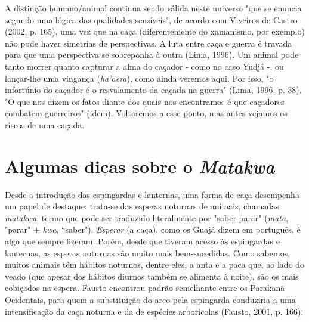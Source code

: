 A distinção humano/animal continua sendo válida neste universo "que se
enuncia segundo uma lógica das qualidades sensíveis", de acordo com
Viveiros de Castro (2002, p. 165), uma vez que na caça (diferentemente
do xamanismo, por exemplo) não pode haver simetrias de perspectivas. A
luta entre caça e guerra é travada para que uma perspectiva se
sobreponha à outra (Lima, 1996). Um animal pode tanto morrer quanto
capturar a alma do caçador - como no caso Yudjá -, ou lançar-lhe uma
vingança (\emph{ha'aera}), como ainda veremos aqui. Por isso, "o
infortúnio do caçador é o resvalamento da caçada na guerra" (Lima, 1996,
p. 38). "O que nos dizem os fatos diante dos quais nos encontramos é que
caçadores combatem guerreiros" (idem). Voltaremos a esse ponto, mas
antes vejamos os riscos de uma caçada.

\section{Algumas dicas sobre o
\emph{Matakwa}}\label{algumas-dicas-sobre-o-matakwa}

Desde a introdução das espingardas e lanternas, uma forma de caça
desempenha um papel de destaque: trata-se das esperas noturnas de
animais, chamadas \emph{matakwa}, termo que pode ser traduzido
literalmente por "saber parar" (\emph{mata}, "parar" + \emph{kwa},
``saber"). \emph{Esperar} (a caça), como os Guajá dizem em português, é
algo que sempre fizeram. Porém, desde que tiveram acesso às espingardas
e lanternas, as esperas noturnas são muito mais bem-sucedidas. Como
sabemos, muitos animais têm hábitos noturnos, dentre eles, a anta e a
paca que, ao lado do veado (que apesar dos hábitos diurnos também se
alimenta à noite), são os mais cobiçados na espera. Fausto encontrou
padrão semelhante entre os Parakanã Ocidentais, para quem a substituição
do arco pela espingarda conduziria a uma intensificação da caça noturna
e da de espécies arborícolas (Fausto, 2001, p. 166).

